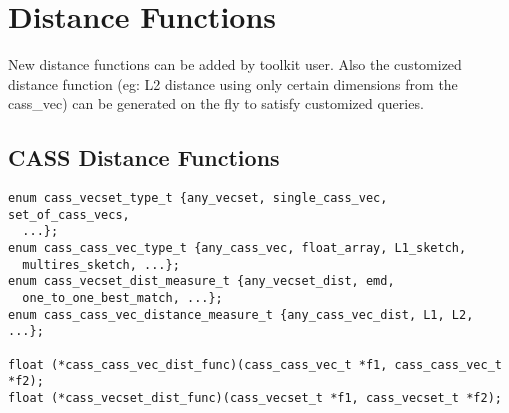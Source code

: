 %       
% 
% 
% 
\section{Distance Functions}
New distance functions can be added by toolkit user. Also the
customized distance function (eg: L2 distance using only certain
dimensions from the cass\_vec) can be generated on the fly to satisfy
customized queries.

\subsection{CASS Distance Functions}
\begin{verbatim}
enum cass_vecset_type_t {any_vecset, single_cass_vec, set_of_cass_vecs,
  ...};
enum cass_cass_vec_type_t {any_cass_vec, float_array, L1_sketch,
  multires_sketch, ...};
enum cass_vecset_dist_measure_t {any_vecset_dist, emd,
  one_to_one_best_match, ...};
enum cass_cass_vec_distance_measure_t {any_cass_vec_dist, L1, L2, ...};

float (*cass_cass_vec_dist_func)(cass_cass_vec_t *f1, cass_cass_vec_t *f2);
float (*cass_vecset_dist_func)(cass_vecset_t *f1, cass_vecset_t *f2);

\end{verbatim}

